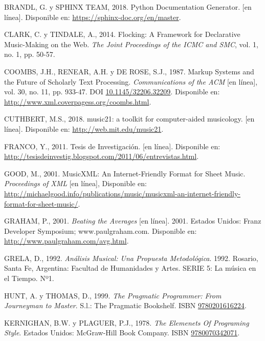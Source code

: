 \documentclass[]{article}
\begin{document}
\leavevmode\hypertarget{ref-sphinx}{}%
BRANDL, G. y SPHINX TEAM, 2018. Python Documentation Generator. {[}en
línea{]}. Disponible en: \url{https://sphinx-doc.org/en/master}.

\leavevmode\hypertarget{ref-clark}{}%
CLARK, C. y TINDALE, A., 2014. Flocking: A Framework for Declarative
Music-Making on the Web. \emph{The Joint Proceedings of the ICMC and
SMC}, vol. 1, no. 1, pp. 50-57.

\leavevmode\hypertarget{ref-coombs}{}%
COOMBS, J.H., RENEAR, A.H. y DE ROSE, S.J., 1987. Markup Systems and the
Future of Scholarly Text Processing. \emph{Communications of the ACM}
{[}en línea{]}, vol. 30, no. 11, pp. 933-47. DOI
\href{https://doi.org/10.1145/32206.32209}{10.1145/32206.32209}.
Disponible en: \url{http://www.xml.coverpagess.org/coombs.html}.

\leavevmode\hypertarget{ref-music21}{}%
CUTHBERT, M.S., 2018. music21: a toolkit for computer-aided musicology.
{[}en línea{]}. Disponible en: \url{http://web.mit.edu/music21}.

\leavevmode\hypertarget{ref-franco}{}%
FRANCO, Y., 2011. Tesis de Investigación. {[}en línea{]}. Disponible en:
\url{http://tesisdeinvestig.blogspot.com/2011/06/entrevistas.html}.

\leavevmode\hypertarget{ref-good}{}%
GOOD, M., 2001. MusicXML: An Internet-Friendly Format for Sheet Music.
\emph{Proceedings of XML} {[}en línea{]}, Disponible en:
\url{http://michaelgood.info/publications/music/musicxml-an-internet-friendly-format-for-sheet-music/}.

\leavevmode\hypertarget{ref-graham2}{}%
GRAHAM, P., 2001. \emph{Beating the Averages} {[}en línea{]}. 2001.
Estados Unidos: Franz Developer Symposium; www.paulgraham.com.
Disponible en: \url{http://www.paulgraham.com/avg.html}.

\leavevmode\hypertarget{ref-grela}{}%
GRELA, D., 1992. \emph{Análisis Musical: Una Propuesta Metodológica}.
1992. Rosario, Santa Fe, Argentina: Facultad de Humanidades y Artes.
SERIE 5: La música en el Tiempo. Nº1.

\leavevmode\hypertarget{ref-hunt}{}%
HUNT, A. y THOMAS, D., 1999. \emph{The Pragmatic Programmer: From
Journeyman to Master}. S.l.: The Pragmatic Bookshelf. ISBN
\href{https://worldcat.org/isbn/9780201616224}{9780201616224}.

\leavevmode\hypertarget{ref-kernighan}{}%
KERNIGHAN, B.W. y PLAGUER, P.J., 1978. \emph{The Elemenets Of Programing
Style}. Estados Unidos: McGraw-Hill Book Company. ISBN
\href{https://worldcat.org/isbn/9780070342071}{9780070342071}.
\end{document}
